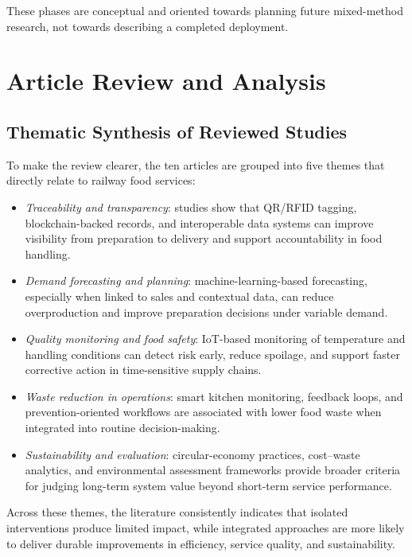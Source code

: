 \documentclass[conference]{IEEEtran}
\begin{document}
These phases are conceptual and oriented towards planning future mixed-method research, not towards describing a completed deployment.

\section{Article Review and Analysis}

\subsection{Thematic Synthesis of Reviewed Studies}

To make the review clearer, the ten articles are grouped into five themes that directly relate to railway food services:

\begin{itemize}[leftmargin=*]
\item \textit{Traceability and transparency}: studies show that QR/RFID tagging, blockchain-backed records, and interoperable data systems can improve visibility from preparation to delivery and support accountability in food handling.
\item \textit{Demand forecasting and planning}: machine-learning-based forecasting, especially when linked to sales and contextual data, can reduce overproduction and improve preparation decisions under variable demand.
\item \textit{Quality monitoring and food safety}: IoT-based monitoring of temperature and handling conditions can detect risk early, reduce spoilage, and support faster corrective action in time-sensitive supply chains.
\item \textit{Waste reduction in operations}: smart kitchen monitoring, feedback loops, and prevention-oriented workflows are associated with lower food waste when integrated into routine decision-making.
\item \textit{Sustainability and evaluation}: circular-economy practices, cost--waste analytics, and environmental assessment frameworks provide broader criteria for judging long-term system value beyond short-term service performance.
\end{itemize}

Across these themes, the literature consistently indicates that isolated interventions produce limited impact, while integrated approaches are more likely to deliver durable improvements in efficiency, service quality, and sustainability.
\end{document}
